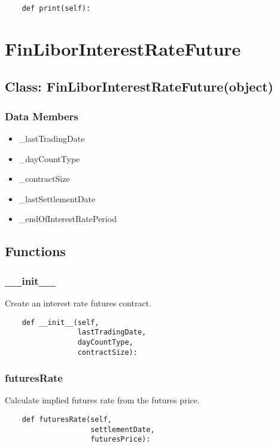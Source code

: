 \documentclass[twoside,11pt]{book}
\begin{document}
\begin{lstlisting}
    def print(self):
\end{lstlisting}

\newpage
\section{FinLiborInterestRateFuture}

\subsection*{Class: FinLiborInterestRateFuture(object)}


\subsubsection*{Data Members}
\begin{itemize}
\item{\_lastTradingDate}
\item{\_dayCountType}
\item{\_contractSize}
\item{\_lastSettlementDate}
\item{\_endOfInterestRatePeriod}
\end{itemize}

\subsection*{Functions}

\subsubsection*{{\bf \_\_init\_\_}}
Create an interest rate futures contract. 

\begin{lstlisting}
    def __init__(self,
                 lastTradingDate,
                 dayCountType,
                 contractSize):
\end{lstlisting}

\subsubsection*{{\bf futuresRate}}
Calculate implied futures rate from the futures price. 

\begin{lstlisting}
    def futuresRate(self,
                    settlementDate,
                    futuresPrice):
\end{lstlisting}
\end{document}
